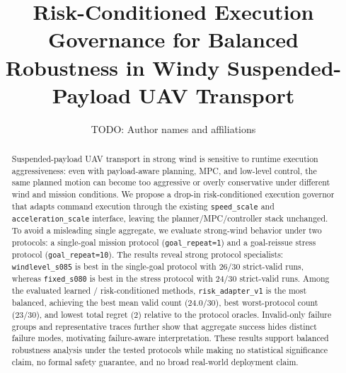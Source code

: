 \documentclass[letterpaper, 10 pt, conference]{ieeeconf}
\title{\LARGE \bf
Risk-Conditioned Execution Governance for Balanced Robustness in Windy Suspended-Payload UAV Transport}
\author{TODO: Author names and affiliations}
\begin{document}
\maketitle

\begin{abstract}
Suspended-payload UAV transport in strong wind is sensitive to runtime
execution aggressiveness: even with payload-aware planning, MPC, and low-level
control, the same planned motion can become too aggressive or overly
conservative under different wind and mission conditions. We propose a drop-in
risk-conditioned execution governor that adapts command execution through the
existing \texttt{speed\_scale} and \texttt{acceleration\_scale} interface,
leaving the planner/MPC/controller stack unchanged. To avoid a misleading
single aggregate, we evaluate strong-wind behavior under two protocols: a
single-goal mission protocol (\texttt{goal\_repeat=1}) and a goal-reissue
stress protocol (\texttt{goal\_repeat=10}). The results reveal strong protocol
specialists: \texttt{windlevel\_s085} is best in the single-goal protocol with
26/30 strict-valid runs, whereas \texttt{fixed\_s080} is best in the stress
protocol with 24/30 strict-valid runs. Among the evaluated learned /
risk-conditioned methods, \texttt{risk\_adapter\_v1} is the most balanced,
achieving the best mean valid count (24.0/30), best worst-protocol count
(23/30), and lowest total regret (2) relative to the protocol oracles.
Invalid-only failure groups and representative traces further show that
aggregate success hides distinct failure modes, motivating failure-aware
interpretation. These results support balanced robustness analysis under the
tested protocols while making no statistical significance claim, no formal
safety guarantee, and no broad real-world deployment claim.
\end{abstract}











\end{document}

